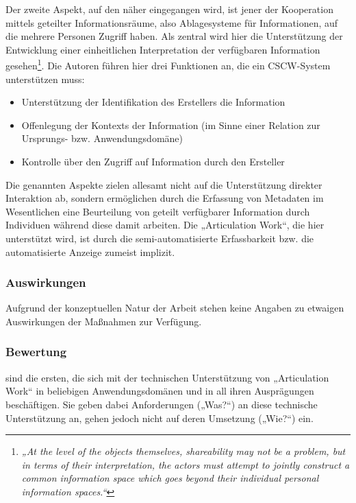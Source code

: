 Der zweite Aspekt, auf den näher eingegangen wird, ist jener der Kooperation mittels geteilter Informationsräume, also Ablagesysteme für Informationen, auf die mehrere Personen Zugriff haben. Als zentral wird hier die Unterstützung der Entwicklung einer einheitlichen Interpretation der verfügbaren Information gesehen\footnote{\emph{„At the level of the objects themselves, shareability may not be a problem, but in terms of their interpretation, the actors must attempt to jointly construct a common information space which goes beyond their individual personal information spaces.“}\citep[][S. 21]{Schmidt92}}. Die Autoren führen hier drei Funktionen an, die ein \gls{CSCW}-System unterstützen muss:
\begin{itemize}
	\item Unterstützung der Identifikation des Erstellers die Information
	\item Offenlegung der Kontexts der Information (im Sinne einer Relation zur Ursprungs- bzw. Anwendungsdomäne)
	\item Kontrolle über den Zugriff auf Information durch den Ersteller
\end{itemize}
Die genannten Aspekte zielen allesamt nicht auf die Unterstützung direkter Interaktion ab, sondern ermöglichen durch die Erfassung von Metadaten im Wesentlichen eine Beurteilung von geteilt verfügbarer Information durch Individuen während diese damit arbeiten. Die „Articulation Work“, die hier unterstützt wird, ist durch die semi-automatisierte Erfassbarkeit bzw. die automatisierte Anzeige zumeist implizit. 

\subsubsection{Auswirkungen}

Aufgrund der konzeptuellen Natur der Arbeit stehen keine Angaben zu etwaigen Auswirkungen der Maßnahmen zur Verfügung.

\subsubsection{Bewertung}

\citet{Schmidt92} sind die ersten, die sich mit der technischen Unterstützung von „Articulation Work“ in beliebigen Anwendungsdomänen und in all ihren Ausprägungen beschäftigen. Sie geben dabei Anforderungen („Was?“) an diese technische Unterstützung an, gehen jedoch nicht auf deren Umsetzung („Wie?“) ein.

